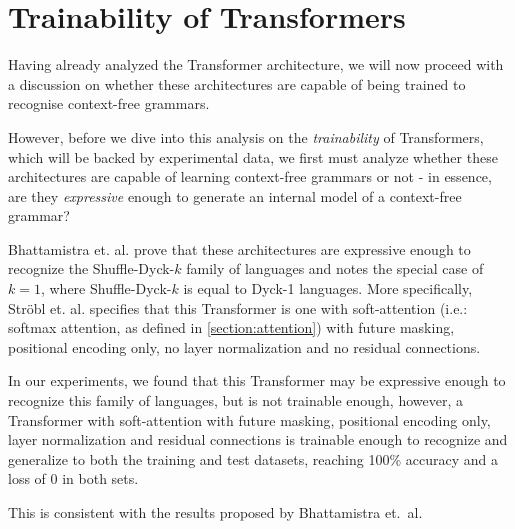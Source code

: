 \chapter{Trainability of Transformers} \label{chapter:4}

Having already analyzed the Transformer architecture, we will now proceed with a discussion on whether these architectures are
capable of being trained to recognise context-free grammars.

However, before we dive into this analysis on the \emph{trainability} of Transformers, which will be backed by experimental data, we
first must analyze whether these architectures are capable of learning context-free grammars or not - in essence,
are they \emph{expressive} enough to generate an internal model of a context-free grammar?

Bhattamistra et. al. \cite{bhattamistra-transformers-formal-languages} prove that these architectures are expressive enough to recognize
the Shuffle-Dyck-$k$ family of languages and notes the special case of $k=1$, where Shuffle-Dyck-$k$ is equal to Dyck-1 languages.
More specifically, Ströbl et. al. \cite{strobl2024formal} specifies that this Transformer is one with soft-attention
(i.e.: softmax attention, as defined in \ref{section:attention}) with future masking, positional encoding only, no layer normalization and no residual connections.

In our experiments, we found that this Transformer may be expressive enough to recognize this family of languages, but is not
trainable enough, however, a Transformer with soft-attention with future masking, positional encoding only, layer normalization and residual connections
is trainable enough to recognize and generalize to both the training and test datasets, reaching 100\% accuracy and a loss of 0 in both sets.

This is consistent with the results proposed by Bhattamistra et.\ al.\ \cite{bhattamistra-transformers-formal-languages}
